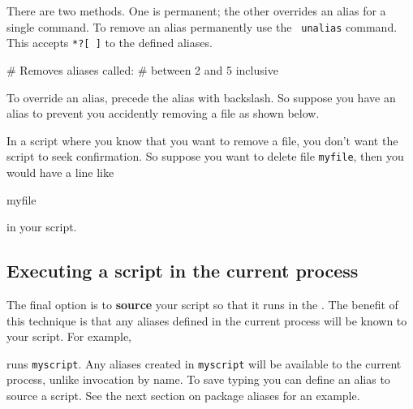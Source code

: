 \documentclass[twoside,11pt,nolof]{starlink}
\begin{document}
There are two methods.  One is permanent; the other overrides an alias
for a single command.  To remove an alias permanently use the {\tt
unalias} command.  This accepts \texttt{*?[~]}
 to  the
defined aliases.

\begin{small}
\begin{terminalv}
                             # Removes aliases called:
                             # between 2 and 5 inclusive
\end{terminalv}
\end{small}

To override an alias, precede the alias with backslash.  So suppose you
have an alias to prevent you accidently removing a file as shown below.

\begin{small}
\begin{terminalv}
\end{terminalv}
\end{small}
In a script where you know that you want to remove a file, you don't
want the script to seek confirmation.  So suppose you want to delete
file \texttt{myfile}, then you would have a line like

\begin{small}
\begin{terminalv}
     \rm myfile
\end{terminalv}
\end{small}
in your script.


\subsection{Executing a script in the current process
\label{sc4_se_source}}

The final option is to \textbf{source} your script so that it runs in the
.  The benefit of this technique is
that any aliases defined in the current process will be known to your
script.  For example,

\begin{small}
\begin{terminalv}
\end{terminalv}
\end{small}
runs \texttt{myscript}.  Any aliases created in \texttt{myscript} will be
available to the current process, unlike invocation by name.
To save typing you can define an alias to source a script.  See the next
section on package aliases for an example.
\end{document}
